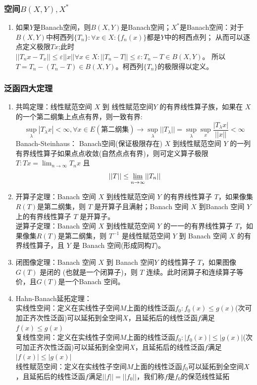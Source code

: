 \documentclass[a4paper, 12pt]{ctexart}
\begin{document}
\subsubsection{空间$B(X,Y),X^*$}
\begin{enumerate}
    \item 如果$Y$是Banach空间，则$B(X,Y)$是Banach空间；$X^*$是Banach空间：对于$B(X,Y)$中柯西列$\{T_n\}:\forall x\in X:\{f_n(x)\}$都是$Y$中的柯西点列；
    从而可以逐点定义极限$Tx$;此时$||T_n x - T_x||\leq\varepsilon||x||\forall x\in X:||T_n-T||\leq \varepsilon:T_n-T\in B(X,Y)$。
    所以$T=T_n-(T_n-T)\in B(X,Y)$。柯西列$\{T_n\}$的极限得以定义。
\end{enumerate}

\subsubsection{泛函四大定理}
\begin{enumerate}
    \item 共鸣定理：线性赋范空间 $X$ 到 线性赋范空间$Y$ 的有界线性算子族，如果在 $X$ 的一个第二纲集上点点有界，则一致有界: 
    $$\underset{ \lambda }{ \sup }|T_{\lambda}x|<\infty ,\forall x\in E(\text{第二纲集})\to \underset{ \lambda }{ \sup }\lvert \lvert T_{\lambda} \rvert \rvert= \underset{ \lambda }{ \sup } \underset{ x }{ \sup }\frac{\lvert T_{\lambda}x\lvert}{\lvert \lvert x \rvert \rvert}<\infty$$
    Banach-Steinhaus： Banach空间(保证极限存在) $X$ 到线性赋范空间 $Y$ 的一列有界线性算子如果点点收敛(自然点点有界)，则可定义算子极限 $T:Tx=\lim_{ n \to \infty }T_{n}x$ 且 $$\lvert \lvert T \rvert \rvert\leq\underset{ n \to \infty }{ \varliminf }\lvert \lvert T_n \rvert \rvert$$
    \item 开算子定理：Banach 空间 $X$ 到线性赋范空间 $Y$ 的有界线性算子 $T$，如果像集$R(T)$是第二纲集，则 $T$ 是开算子且满射；Banach 空间 $X$ 到Banach 空间 $Y$ 上的有界线性算子 $T$ 是开算子。 \\
    逆算子定理：Banach 空间 $X$ 到线性赋范空间 $Y$ 的一一的有界线性算子 $T$，如果像集$R(T)$是第二纲集，则 $T^{-1}$ 是线性赋范空间 $Y$ 到 Banach 空间 $X$ 的有界线性算子，且 $Y$ 是 Banach 空间(形成同构$T$)。
    \item 闭图像定理：Banach 空间 $X$ 到 Banach 空间$Y$ 的线性算子 $T$，如果图像 $G(T)$ 是闭的 (也就是一个闭算子)，则 $T$ 连续。此时闭算子和连续算子等价，且$G(T)$是一个Banach 空间。
    \item Hahn-Banach延拓定理：\\
    实线性空间：定义在实线性子空间$M$上面的线性泛函$f_{0}:f_{0}(x)\leq g(x)$(次可加正齐次性泛函)可以延拓到全空间$X$，且延拓后的线性泛函$f$满足$f(x)\leq g(x)$\\
    复线性空间：定义在实线性子空间$M$上面的线性泛函$f_{0}:|f_{0}(x)|\leq |g(x)|$(次可加正齐次性泛函)可以延拓到全空间$X$，且延拓后的线性泛函$f$满足$|f(x)|\leq |g(x)|$\\
    线性赋范空间：定义在实线性子空间$M$上面的线性泛函$f_{0}$可以延拓到全空间$X$，且延拓后的线性泛函$f$满足$||f||=||f_{0}||$，我们称$f$是$f_{0}$的保范线性延拓
\end{enumerate}
\end{document}
